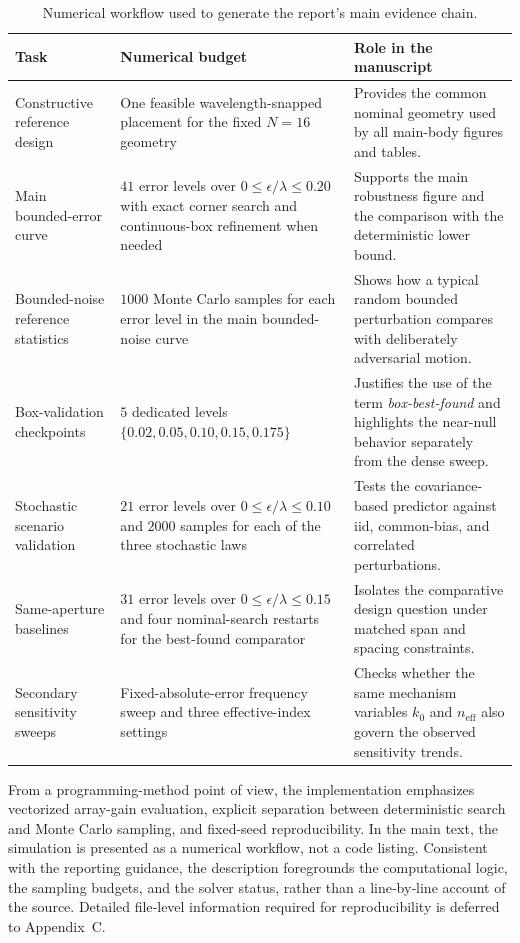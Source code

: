 \begin{table}[H]
\centering
\small
\caption{Numerical workflow used to generate the report's main evidence chain.}
\label{tab:workflow_overview}
\begin{tabularx}{\textwidth}{>{\raggedright\arraybackslash}p{} >{\raggedright\arraybackslash}p{} >{\raggedright\arraybackslash}X}
\toprule
Task & Numerical budget & Role in the manuscript \\
\midrule
Constructive reference design & One feasible wavelength-snapped placement for the fixed $N=16$ geometry & Provides the common nominal geometry used by all main-body figures and tables. \\
Main bounded-error curve & $41$ error levels over $0 \le \epsilon/\lambda \le 0.20$ with exact corner search and continuous-box refinement when needed & Supports the main robustness figure and the comparison with the deterministic lower bound. \\
Bounded-noise reference statistics & $1000$ Monte Carlo samples for each error level in the main bounded-noise curve & Shows how a typical random bounded perturbation compares with deliberately adversarial motion. \\
Box-validation checkpoints & $5$ dedicated levels $\{0.02, 0.05, 0.10, 0.15, 0.175\}$ & Justifies the use of the term \emph{box-best-found} and highlights the near-null behavior separately from the dense sweep. \\
Stochastic scenario validation & $21$ error levels over $0 \le \epsilon/\lambda \le 0.10$ and $2000$ samples for each of the three stochastic laws & Tests the covariance-based predictor against iid, common-bias, and correlated perturbations. \\
Same-aperture baselines & $31$ error levels over $0 \le \epsilon/\lambda \le 0.15$ and four nominal-search restarts for the best-found comparator & Isolates the comparative design question under matched span and spacing constraints. \\
Secondary sensitivity sweeps & Fixed-absolute-error frequency sweep and three effective-index settings & Checks whether the same mechanism variables $k_0$ and $n_{\mathrm{eff}}$ also govern the observed sensitivity trends. \\
\bottomrule
\end{tabularx}
\end{table}

From a programming-method point of view, the implementation emphasizes vectorized array-gain evaluation, explicit separation between deterministic search and Monte Carlo sampling, and fixed-seed reproducibility. In the main text, the simulation is presented as a numerical workflow, not a code listing. Consistent with the reporting guidance, the description foregrounds the computational logic, the sampling budgets, and the solver status, rather than a line‑by‑line account of the source. Detailed file‑level information required for reproducibility is deferred to Appendix~C.

